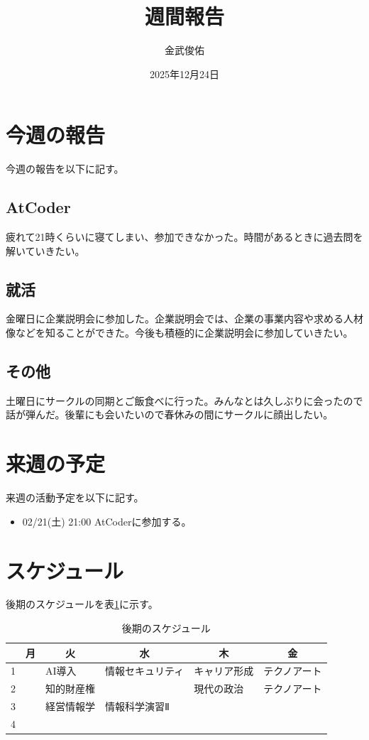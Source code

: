 \documentclass[a4paper,12pt]{ujarticle}
\title{週間報告}
\author{金武俊佑}
\date{2025年12月24日}
\newcommand{\thc}[1]{\multicolumn{1}{c|}{#1}}
\begin{document}
\maketitle

\section{今週の報告}\label{sec:thisweek}
今週の報告を以下に記す。
\subsection{AtCoder}\label{sec:atcoder}
疲れて21時くらいに寝てしまい、参加できなかった。時間があるときに過去問を解いていきたい。
\subsection{就活}\label{sec:job}
金曜日に企業説明会に参加した。企業説明会では、企業の事業内容や求める人材像などを知ることができた。今後も積極的に企業説明会に参加していきたい。
\subsection{その他}\label{sec:other}
土曜日にサークルの同期とご飯食べに行った。みんなとは久しぶりに会ったので話が弾んだ。後輩にも会いたいので春休みの間にサークルに顔出したい。
\section{来週の予定}\label{sec:nextweek}
来週の活動予定を以下に記す。
\begin{itemize}
  \item 02/21(土) 21:00 AtCoderに参加する。
\end{itemize}
\section{スケジュール}\label{sec:schedule}
後期のスケジュールを表\ref{tab:studyschedule}に示す。

\begin{table}[H]
  \caption{後期のスケジュール}\label{tab:studyschedule}
  \centering
  \begin{tabular}{|p{4mm}||p{30mm}|p{30mm}|p{30mm}|p{30mm}|p{30mm}|}\hline
        & \thc{月} & \thc{火} & \thc{水} & \thc{木} & \thc{金} \\ \hline\hline
     1  &     & AI導入    &情報セキュリティ     & キャリア形成 & テクノアート  \\ \hline
     2  &     & 知的財産権 &  & 現代の政治 & テクノアート \\ \hline
     3  &     & 経営情報学 & 情報科学演習Ⅱ &  &  \\ \hline
     4  &  &  & &  & \\ \hline
  \end{tabular}
\end{table}
\end{document}
